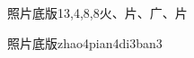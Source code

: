 \begin{entry}{照片底版}{13,4,8,8}{⽕、⽚、⼴、⽚}
  \begin{phonetics}{照片底版}{zhao4pian4di3ban3}
  \end{phonetics}
\end{entry}
